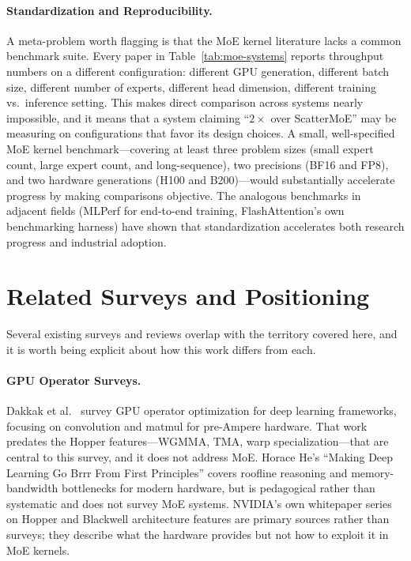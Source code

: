 \documentclass[10pt]{article}
\begin{document}
\paragraph{Standardization and Reproducibility.}
A meta-problem worth flagging is that the MoE kernel literature lacks a common benchmark suite. Every paper in Table~\ref{tab:moe-systems} reports throughput numbers on a different configuration: different GPU generation, different batch size, different number of experts, different head dimension, different training vs.\ inference setting. This makes direct comparison across systems nearly impossible, and it means that a system claiming ``$2\times$ over ScatterMoE'' may be measuring on configurations that favor its design choices. A small, well-specified MoE kernel benchmark---covering at least three problem sizes (small expert count, large expert count, and long-sequence), two precisions (BF16 and FP8), and two hardware generations (H100 and B200)---would substantially accelerate progress by making comparisons objective. The analogous benchmarks in adjacent fields (MLPerf for end-to-end training, FlashAttention's own benchmarking harness) have shown that standardization accelerates both research progress and industrial adoption.

\section{Related Surveys and Positioning}
\label{sec:related}

Several existing surveys and reviews overlap with the territory covered here, and it is worth being explicit about how this work differs from each.

\paragraph{GPU Operator Surveys.} Dakkak et al.~\citep{dakkak2019accelerating} survey GPU operator optimization for deep learning frameworks, focusing on convolution and matmul for pre-Ampere hardware. That work predates the Hopper features---WGMMA, TMA, warp specialization---that are central to this survey, and it does not address MoE. Horace He's ``Making Deep Learning Go Brrr From First Principles'' \citep{horace2023flash} covers roofline reasoning and memory-bandwidth bottlenecks for modern hardware, but is pedagogical rather than systematic and does not survey MoE systems. NVIDIA's own whitepaper series on Hopper \citep{nvidia2022hopper} and Blackwell \citep{nvidia2024blackwell} architecture features are primary sources rather than surveys; they describe what the hardware provides but not how to exploit it in MoE kernels.
\end{document}
